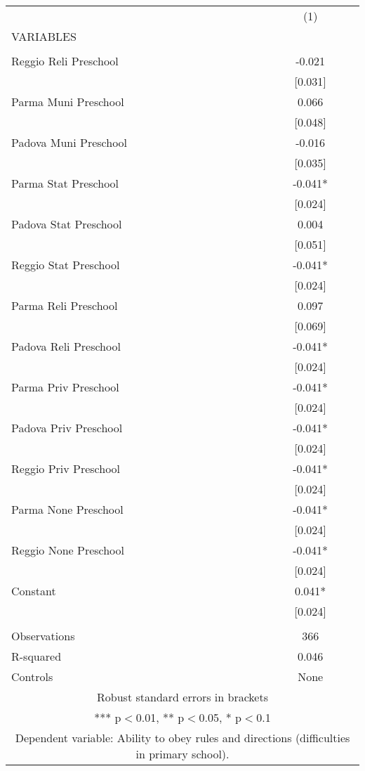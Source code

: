 \begin{tabular}{lc} \hline
 & (1) \\
VARIABLES &  \\ \hline
 &  \\
Reggio Reli Preschool & -0.021 \\
 & [0.031] \\
Parma Muni Preschool & 0.066 \\
 & [0.048] \\
Padova Muni Preschool & -0.016 \\
 & [0.035] \\
Parma Stat Preschool & -0.041* \\
 & [0.024] \\
Padova Stat Preschool & 0.004 \\
 & [0.051] \\
Reggio Stat Preschool & -0.041* \\
 & [0.024] \\
Parma Reli Preschool & 0.097 \\
 & [0.069] \\
Padova Reli Preschool & -0.041* \\
 & [0.024] \\
Parma Priv Preschool & -0.041* \\
 & [0.024] \\
Padova Priv Preschool & -0.041* \\
 & [0.024] \\
Reggio Priv Preschool & -0.041* \\
 & [0.024] \\
Parma None Preschool & -0.041* \\
 & [0.024] \\
Reggio None Preschool & -0.041* \\
 & [0.024] \\
Constant & 0.041* \\
 & [0.024] \\
 &  \\
Observations & 366 \\
R-squared & 0.046 \\
 Controls & None \\ \hline
\multicolumn{2}{c}{ Robust standard errors in brackets} \\
\multicolumn{2}{c}{ *** p$<$0.01, ** p$<$0.05, * p$<$0.1} \\
\multicolumn{2}{c}{ Dependent variable: Ability to obey rules and directions (difficulties in primary school).} \\
\end{tabular}
